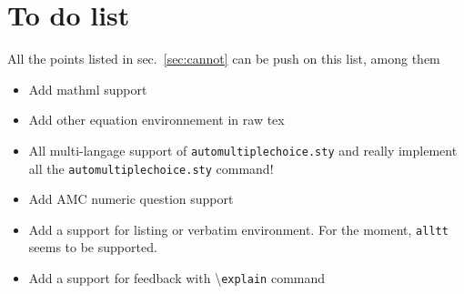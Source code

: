 \documentclass[a4paper]{article}
\begin{document}
\section{To do list}
All the points listed in sec.~\ref{sec:cannot} can be push on this list, among them
\begin{itemize}
\item Add mathml support
\item Add other equation environnement in raw tex
\item All multi-langage support of \texttt{automultiplechoice.sty} and really implement all the \texttt{automultiplechoice.sty} command!
\item Add AMC numeric question support
\item Add a support for listing or verbatim environment. For the moment, \texttt{alltt} seems to be supported.
\item Add a support for feedback with \textbackslash\texttt{explain} command
\end{itemize}
\end{document}
